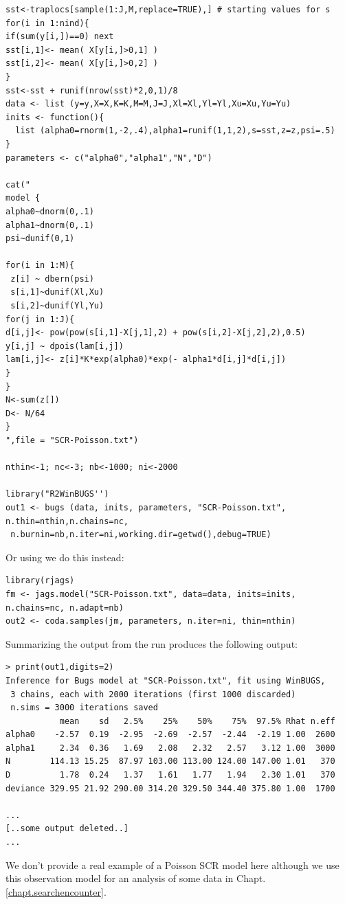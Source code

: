{\small 
\begin{verbatim}
sst<-traplocs[sample(1:J,M,replace=TRUE),] # starting values for s
for(i in 1:nind){
if(sum(y[i,])==0) next
sst[i,1]<- mean( X[y[i,]>0,1] )
sst[i,2]<- mean( X[y[i,]>0,2] )
}
sst<-sst + runif(nrow(sst)*2,0,1)/8
data <- list (y=y,X=X,K=K,M=M,J=J,Xl=Xl,Yl=Yl,Xu=Xu,Yu=Yu)
inits <- function(){
  list (alpha0=rnorm(1,-2,.4),alpha1=runif(1,1,2),s=sst,z=z,psi=.5)
}
parameters <- c("alpha0","alpha1","N","D")

cat("
model {
alpha0~dnorm(0,.1)
alpha1~dnorm(0,.1)
psi~dunif(0,1)

for(i in 1:M){
 z[i] ~ dbern(psi)
 s[i,1]~dunif(Xl,Xu)
 s[i,2]~dunif(Yl,Yu) 
for(j in 1:J){
d[i,j]<- pow(pow(s[i,1]-X[j,1],2) + pow(s[i,2]-X[j,2],2),0.5)
y[i,j] ~ dpois(lam[i,j])
lam[i,j]<- z[i]*K*exp(alpha0)*exp(- alpha1*d[i,j]*d[i,j])
}
}
N<-sum(z[])
D<- N/64
}
",file = "SCR-Poisson.txt")

nthin<-1; nc<-3; nb<-1000; ni<-2000

library("R2WinBUGS'')
out1 <- bugs (data, inits, parameters, "SCR-Poisson.txt", n.thin=nthin,n.chains=nc,
 n.burnin=nb,n.iter=ni,working.dir=getwd(),debug=TRUE)
\end{verbatim}
}
Or using \jags we do this instead:
{\small
\begin{verbatim}
library(rjags)
fm <- jags.model("SCR-Poisson.txt", data=data, inits=inits, n.chains=nc, n.adapt=nb)
out2 <- coda.samples(jm, parameters, n.iter=ni, thin=nthin)
\end{verbatim}
}
Summarizing the output from the \winbugs run produces the following output:
{\small
\begin{verbatim}
> print(out1,digits=2)
Inference for Bugs model at "SCR-Poisson.txt", fit using WinBUGS,
 3 chains, each with 2000 iterations (first 1000 discarded)
 n.sims = 3000 iterations saved
           mean    sd   2.5%    25%    50%    75%  97.5% Rhat n.eff
alpha0    -2.57  0.19  -2.95  -2.69  -2.57  -2.44  -2.19 1.00  2600
alpha1     2.34  0.36   1.69   2.08   2.32   2.57   3.12 1.00  3000
N        114.13 15.25  87.97 103.00 113.00 124.00 147.00 1.01   370
D          1.78  0.24   1.37   1.61   1.77   1.94   2.30 1.01   370
deviance 329.95 21.92 290.00 314.20 329.50 344.40 375.80 1.00  1700

...
[..some output deleted..]
...
\end{verbatim}
}

We don't provide a real example of a Poisson SCR model here although
we use this observation model for an analysis of some data in Chapt.
\ref{chapt.searchencounter}.

